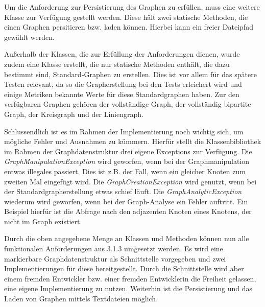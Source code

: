 \documentclass[a4paper,12pt,ngerman,chapterprefix=false,listof=totoc,bibliography=totoc]{scrreprt}
\begin{document}
{{{Um die Anforderung zur Persistierung des Graphen zu erfüllen, muss eine weitere Klasse zur Verfügung gestellt werden. Diese hält zwei statische Methoden, die einen Graphen persitieren bzw. laden können. Hierbei kann ein freier Dateipfad gewählt werden.

Außerhalb der Klassen, die zur Erfüllung der Anforderungen dienen, wurde zudem eine Klasse erstellt, die nur statische Methoden enthält, die dazu bestimmt sind, Standard-Graphen zu erstellen. Dies ist vor allem für das spätere Testen relevant, da so die Grapherstellung bei den Tests erleichert wird und einige Metriken bekannte Werte für diese Standardgraphen haben. Zur den verfügbaren Graphen gehören der vollständige Graph, der vollständig bipartite Graph, der Kreisgraph und der Liniengraph.

Schlussendlich ist es im Rahmen der Implementierung noch wichtig sich, um mögliche Fehler und Ausnahmen zu kümmern. Hierfür stellt die Klassenbibliothek im Rahmen der Graphdatenstruktur drei eigene Exceptions zur Verfügung. Die \textit{GraphManipulationException} wird geworfen, wenn bei der Graphmanipulation entwas illegales passiert. Dies ist z.B. der Fall, wenn ein gleicher Knoten zum zweiten Mal eingefügt wird. Die \textit{GraphCreationException} wird genutzt, wenn bei der Standardgrapherstellung etwas schief läuft. Die \textit{GraphAnalyticException} wiederum wird geworfen, wenn bei der Graph-Analyse ein Fehler auftritt. Ein Beispiel hierfür ist die Abfrage nach den adjazenten Knoten eines Knotens, der nicht im Graph existiert.

Durch die oben angegebene Menge an Klassen und Methoden können nun alle funktionalen Anforderungen aus 3.1.3 umgesetzt werden. Es wird eine markierbare Graphdatenstruktur als Schnittstelle vorgegeben und zwei Implementierungen für diese bereitgestellt. Durch die Schnittstelle wird aber einem fremden Entwickler bzw. einer fremden Entwicklerin die Freiheit gelassen, eine eigene Implementierung zu nutzen. Weiterhin ist die Persistierung und das Laden von Graphen mittels Textdateien möglich.

}}}
\end{document}
